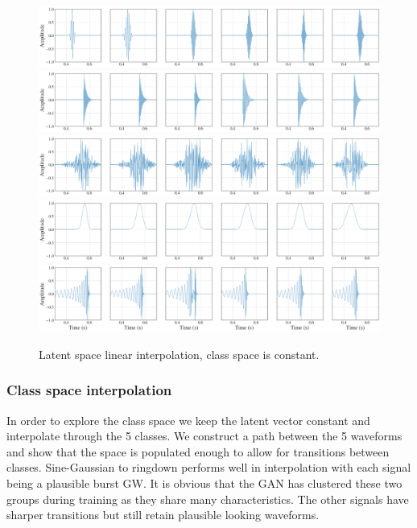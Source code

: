 \documentclass[12pt]{iopart}
\begin{document}
\begin{figure}
    \centering
    \includegraphics[width=\textwidth]{figures/generations/z_interp_sg.png}
    \includegraphics[width=\textwidth]{figures/generations/z_interp_rd.png}
    \includegraphics[width=\textwidth]{figures/generations/z_interp_wnb.png}
    \includegraphics[width=\textwidth]{figures/generations/z_interp_blip.png}
    \includegraphics[width=\textwidth]{figures/generations/z_interp_bbh.png}
    \caption{Latent space linear interpolation, class space is constant.}
    \label{fig:z_interp}
\end{figure}

\subsubsection{Class space interpolation}
In order to explore the class space we keep the latent vector constant and interpolate through the 5 classes. We construct a path between the 5 waveforms and show that the space is populated enough to allow for transitions between classes. Sine-Gaussian to ringdown performs well in interpolation with each signal being a plausible burst GW. It is obvious that the GAN has clustered these two groups during training as they share many characteristics. The other signals have sharper transitions but still retain plausible looking waveforms. 
\end{document}
